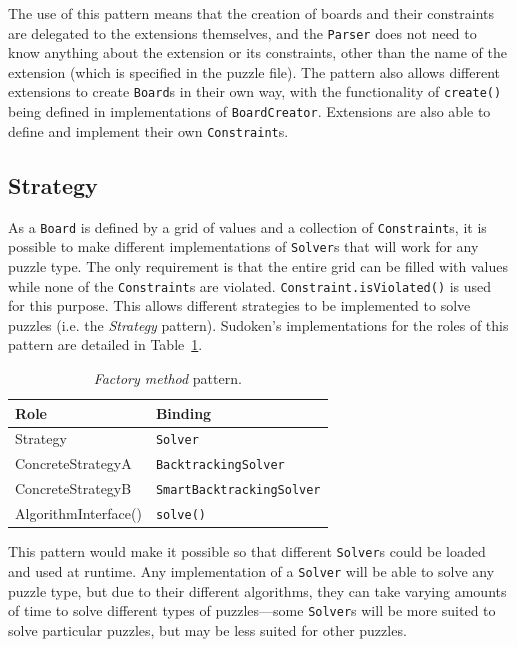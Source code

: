 \documentclass[a4paper, 11pt]{article}
\begin{document}
The use of this pattern means that the creation of boards and their constraints are delegated to the extensions themselves, and the \texttt{Parser} does not need to know anything about the extension or its constraints, other than the name of the extension (which is specified in the puzzle file). The pattern also allows different extensions to create \texttt{Board}s in their own way, with the functionality of \texttt{create()} being defined in implementations of \texttt{BoardCreator}. Extensions are also able to define and implement their own \texttt{Constraint}s.

\subsection{Strategy}

As a \texttt{Board} is defined by a grid of values and a collection of \texttt{Constraint}s, it is possible to make different implementations of \texttt{Solver}s that will work for any puzzle type. The only requirement is that the entire grid can be filled with values while none of the \texttt{Constraint}s are violated. \texttt{Constraint.isViolated()} is used for this purpose. This allows different strategies to be implemented to solve puzzles (i.e. the \textit{Strategy} pattern). Sudoken's implementations for the roles of this pattern are detailed in Table~\ref{table:strategy}.

\begin{table}[h!]
\centering
\begin{tabular}{l l}
\textbf{Role}        & \textbf{Binding} \\ \hline
Strategy             & \texttt{Solver} \\
ConcreteStrategyA    & \texttt{BacktrackingSolver} \\
ConcreteStrategyB    & \texttt{SmartBacktrackingSolver} \\
AlgorithmInterface() & \texttt{solve()} \\
\end{tabular}
\caption{\textit{Factory method} pattern.}
\label{table:strategy}
\end{table}

This pattern would make it possible so that different \texttt{Solver}s could be loaded and used at runtime. Any implementation of a \texttt{Solver} will be able to solve any puzzle type, but due to their different algorithms, they can take varying amounts of time to solve different types of puzzles---some \texttt{Solver}s will be more suited to solve particular puzzles, but may be less suited for other puzzles.
\end{document}
